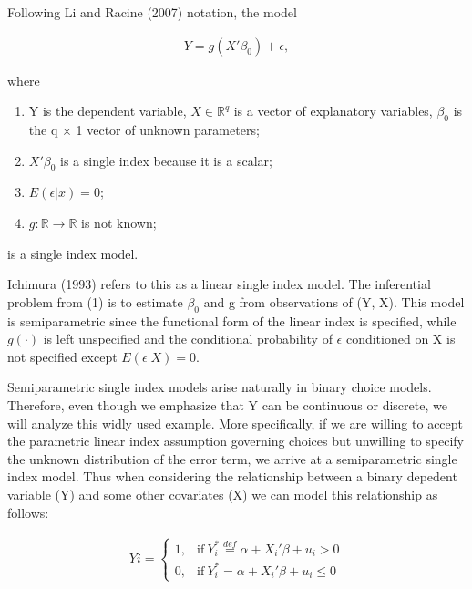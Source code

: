 \documentclass[a4paper]{article}
\begin{document}
Following Li and Racine (2007) notation, the model 

\begin{eqnarray}
Y = g(X'\beta_0) + \epsilon,  %
\end{eqnarray}

where

\begin{enumerate}
	\item Y is the dependent variable, $X\in \mathbb{R}^{q}$ is a vector of explanatory variables, $\beta_0$ is the q $\times$ 1 vector of unknown parameters; %
	\item $X'\beta_0$ is a single index because it is a scalar;
	\item $ E(\epsilon|x) = 0 $;
	\item $g: \mathbb{R} \rightarrow \mathbb{R} $ is not known;
\end{enumerate}

is a single index model.

\vspace{5mm} 

Ichimura (1993) refers to this as a linear single index model. The inferential problem from (1) is to estimate $\beta_0$ and g from observations of (Y, X). This model is semiparametric since the functional form of the linear index is specified, while $g(\cdot)$ is left unspecified and the conditional probability of $\epsilon$ conditioned on X is not specified except $ E(\epsilon|X) = 0 $.

\vspace{5mm} 

Semiparametric single index models arise naturally in binary choice models. Therefore, even though we emphasize that Y can be continuous or discrete, we will analyze this widly used example. More specifically, if we are willing to accept the parametric linear index assumption governing choices but unwilling to specify the unknown distribution of the error term, we arrive at a semiparametric single index model. Thus when considering the relationship between a binary depedent variable (Y) and some other covariates (X) we can model this relationship as follows:

\begin{eqnarray}
    Yi = 
    \begin{cases}
      1, & \text{if}\ Y_i^* \stackrel{def}{=} \alpha + X_i'\beta + u_i > 0 \\
      0, & \text{if}\ Y_i^* = \alpha + X_i'\beta + u_i \leq 0
    \end{cases}
\end{eqnarray}
\end{document}
